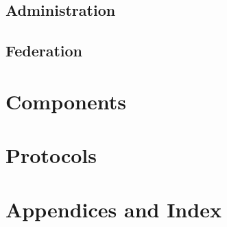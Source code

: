 



\chapter{Administration}





\chapter{Federation}





\part{Components} %







\part{Protocols} %








\part{Appendices and Index}

\appendix




